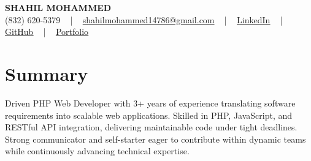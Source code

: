 \documentclass[letterpaper,10pt]{article}
\begin{document}
\begin{center}
    {\fontsize{14pt}{12pt}\selectfont \textbf{\MakeUppercase{Shahil Mohammed}}}\\ \vspace{2pt}
    \fontsize{10pt}{12pt}\selectfont (832) 620-5379 ~ | ~ \href{mailto:shahilmohammed14786@gmail.com}{shahilmohammed14786@gmail.com} ~ | ~  
    \href{https://www.linkedin.com/in/shahil-mohammed-9652931a1/}{\color{blue}\underline{LinkedIn}}  ~ | ~ 
    \href{https://github.com/freakbeast14}{\color{blue}\underline{GitHub}} ~ | ~ 
    \href{https://shahil-mohammed.netlify.app/}{\color{blue}\underline{Portfolio}}
    \vspace{-8pt}
\end{center}

\section{Summary}
\vspace{-2pt}\fontsize{8pt}{9pt}\selectfont
Driven PHP Web Developer with 3+ years of experience translating software requirements into scalable web applications. Skilled in PHP, JavaScript, and RESTful API integration, delivering maintainable code under tight deadlines. Strong communicator and self-starter eager to contribute within dynamic teams while continuously advancing technical expertise.
 \vspace{-5pt}
 
\vspace{-2pt}
\end{document}
